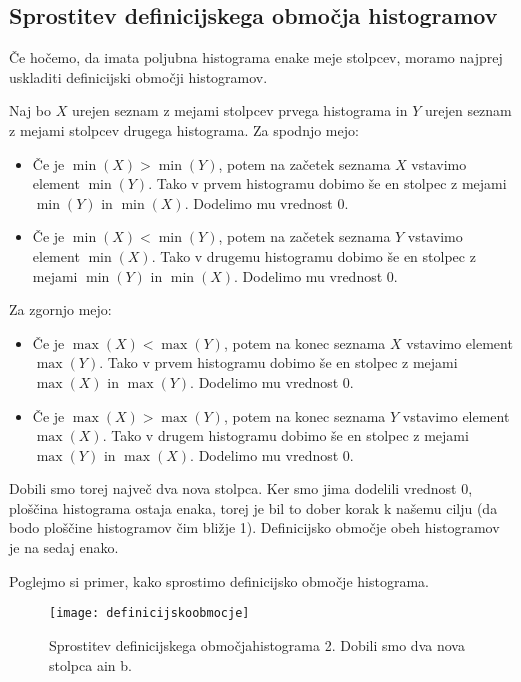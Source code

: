 \subsection{Sprostitev definicijskega območja histogramov} \label{podpoglavje-4-1}

Če hočemo, da imata poljubna histograma enake meje stolpcev, moramo najprej uskladiti definicijski območji histogramov.

Naj bo $X$ urejen seznam z mejami stolpcev prvega histograma in $Y$ urejen seznam z mejami stolpcev drugega histograma. Za spodnjo mejo:
\begin{itemize}
	\item Če je $\min(X) > \min(Y)$, potem na začetek seznama $X$ vstavimo element $\min(Y)$. Tako v prvem histogramu dobimo še en stolpec z mejami $\min(Y)$ in $\min(X)$. Dodelimo mu vrednost $0$.
	\item Če je $\min(X) < \min(Y)$, potem na začetek seznama $Y$ vstavimo element $\min(X)$. Tako v drugemu histogramu dobimo še en stolpec z mejami $\min(Y)$ in $\min(X)$. Dodelimo mu vrednost $0$.
\end{itemize}
Za zgornjo mejo:
\begin{itemize}
	\item Če je $\max(X) < \max(Y)$, potem na konec seznama $X$ vstavimo element $\max(Y)$. Tako v prvem histogramu dobimo še en stolpec z mejami $\max(X)$ in $\max(Y)$. Dodelimo mu vrednost $0$.
	\item Če je $\max(X) > \max(Y)$, potem na konec seznama $Y$ vstavimo element $\max(X)$. Tako v drugem histogramu dobimo še en stolpec z mejami $\max(Y)$ in $\max(X)$. Dodelimo mu vrednost $0$.
\end{itemize}
Dobili smo torej največ dva nova stolpca. Ker smo jima dodelili vrednost $0$, ploščina histograma ostaja enaka, torej je bil to dober korak k našemu cilju (da bodo ploščine histogramov čim bližje 1). Definicijsko območje obeh histogramov je na sedaj enako.

\begin{zgled}

Poglejmo si primer, kako sprostimo definicijsko območje histograma.

\begin{figure}[!bh]
    \centering
    \texttt{[image: definicijskoobmocje]}
    \caption{Sprostitev definicijskega območjahistograma 2. Dobili smo dva nova stolpca ain b.}
\end{figure}

\end{zgled}